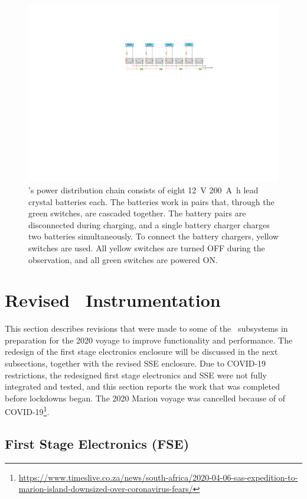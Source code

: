 \begin{figure}
	\centering
	\includegraphics[width=\linewidth]{Figures/power_schematic}
	\caption{\prizm's power distribution chain consists of eight \SI{12}{\volt} \SI{200}{\ampere \hour} lead crystal batteries each. The batteries work in pairs that, through the green switches, are cascaded together. The battery pairs are disconnected during charging, and a single battery charger charges two batteries simultaneously. To  connect the battery chargers, yellow switches are used. All yellow switches are turned OFF during the observation, and all green switches are powered ON.}
	\label{Fig:power}
\end{figure}

\section{Revised \prizm~Instrumentation}

This section describes revisions that were made to some of the \prizm\ subsystems in preparation for the 2020 voyage to improve functionality and performance. The redesign of the first stage electronics enclosure will be discussed in the next subsections, together with the revised SSE enclosure. Due to COVID-19 restrictions, the redesigned first stage electronics and SSE were not fully integrated and tested, and this section reports the work that was completed before lockdowns began. The 2020 Marion voyage was cancelled because of of COVID-19\footnote{\url{https://www.timeslive.co.za/news/south-africa/2020-04-06-sas-expedition-to-marion-island-downsized-over-coronavirus-fears/}}. 

\subsection{First Stage Electronics (FSE)}

